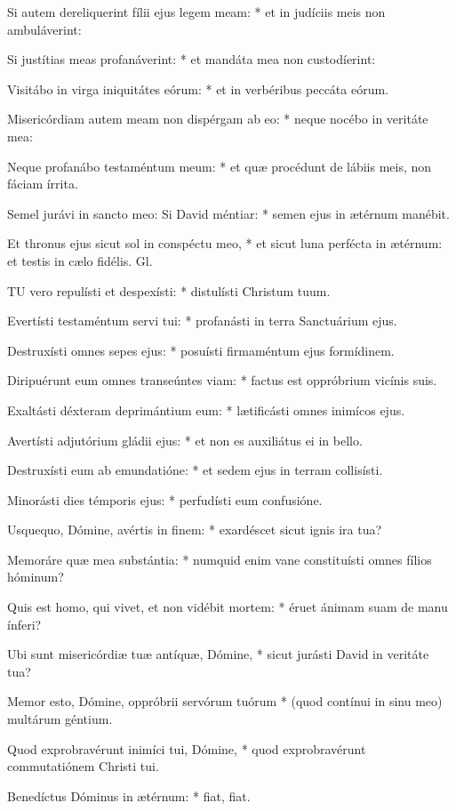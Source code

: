 Si autem dereliquerint fílii ejus legem meam: * et in judíciis meis non ambuláverint:

Si justítias meas profanáverint: * et mandáta mea non custodíerint:

Visitábo in virga iniquitátes eórum: * et in verbéribus peccáta eórum.

Misericórdiam autem meam non dispérgam ab eo: * neque nocébo in veritáte mea:

Neque profanábo testaméntum meum: * et quæ procédunt de lábiis meis, non fáciam írrita.

Semel jurávi in sancto meo: Si David méntiar: * semen ejus in ætérnum manébit.

Et thronus ejus sicut sol in conspéctu meo, * et sicut luna perfécta in ætérnum: et testis in cælo fidélis. Gl.


\lettrine[lines=2]{T}{U} vero repulísti et despexísti: * distulísti Christum tuum.

Evertísti testaméntum servi tui: * profanásti in terra Sanctuárium ejus.

Destruxísti omnes sepes ejus: * posuísti firmaméntum ejus formídinem.

Diripuérunt eum omnes transeúntes viam: * factus est oppróbrium vicínis suis.

Exaltásti déxteram deprimántium eum: * lætificásti omnes inimícos ejus.

Avertísti adjutórium gládii ejus: * et non es auxiliátus ei in bello.

Destruxísti eum ab emundatióne: * et sedem ejus in terram collisísti.

Minorásti dies témporis ejus: * perfudísti eum confusióne.

Usquequo, Dómine, avértis in finem: * exardéscet sicut ignis ira tua?

Memoráre quæ mea substántia: * numquid enim vane constituísti omnes fílios hóminum?

Quis est homo, qui vivet, et non vidébit mortem: * éruet ánimam suam de manu ínferi?

Ubi sunt misericórdiæ tuæ antíquæ, Dómine, * sicut jurásti David in veritáte tua?

Memor esto, Dómine, oppróbrii servórum tuórum * (quod contínui in sinu meo) multárum géntium.

Quod exprobravérunt inimíci tui, Dómine, * quod exprobravérunt commutatiónem Christi tui.

Benedíctus Dóminus in ætérnum: * fiat, fiat.

